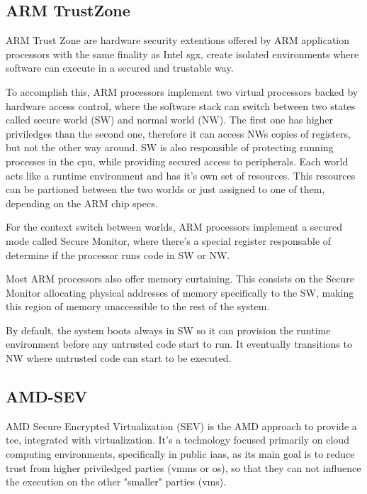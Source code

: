\subsection{ARM TrustZone}
\label{ssec:armtz}

ARM Trust Zone \cite{armTZPaper} are hardware security extentions offered by ARM application processors with the same finality as Intel \gls{sgx}, create isolated environments where software can execute in a secured and trustable way. 

To accomplish this, ARM processors implement two virtual processors backed by hardware access control, where the software stack can switch between two states called secure world (SW) and normal world (NW). 
The first one has higher priviledges than the second one, therefore it can access NWs copies of registers, but not the other way around. SW is also responsible of protecting running processes in the \gls{cpu}, while providing secured access to peripherals. 
Each world acts like a runtime environment and has it's own set of resources. This resources can be partioned between the two worlds or just assigned to one of them, depending on the ARM chip specs.

For the context switch between worlds, ARM processors implement a secured mode called Secure Monitor, where there's a special register responsable of determine if the processor runs code in SW or NW. 

Most ARM processors also offer memory curtaining. This consists on the Secure Monitor allocating physical addresses of memory specifically to the SW, making this region of memory unaccessible to the rest of the system.

By default, the system boots always in SW so it can provision the runtime environment before any untrusted code start to run. It eventually transitions to NW where untrusted code can start to be executed. 

\subsection{AMD-SEV}
\label{ssec:amdsev}
AMD Secure Encrypted Virtualization (SEV) is the AMD approach to provide a \gls{tee}, integrated with virtualization. It's a technology focused primarily on cloud computing environments, specifically in public \gls{iaas}, as its main goal is to reduce trust from higher priviledged parties (\gls{vmm}s or \gls{os}), so that they can not influence the execution on the other "smaller" parties (\gls{vm}s). 

